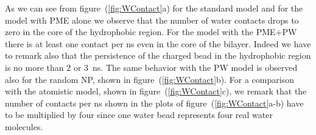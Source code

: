 As we can see from figure~(\ref{fig:WContact}a) for the standard \martini model and for the model with \ac{PME} alone we observe that the number of water contacts drops to zero in the core of the hydrophobic region. For the model with the \ac{PME}+\ac{PW} there is at least one contact per ns even in the core of the bilayer. Indeed we have to remark also that the persistence of the charged bead in the hydrophobic region is no more than $2$ or $3$~ns. The same behavior with the \ac{PW} model is observed also for the random \ac{NP}, shown in figure~(\ref{fig:WContact}b). For a comparison with the atomistic model, shown in figure~(\ref{fig:WContact}c), we remark that the number of contacts per ns shown in the plots of figure~(\ref{fig:WContact}a-b) have to be multiplied by four since one \martini water bead represents four real water molecules.
 

